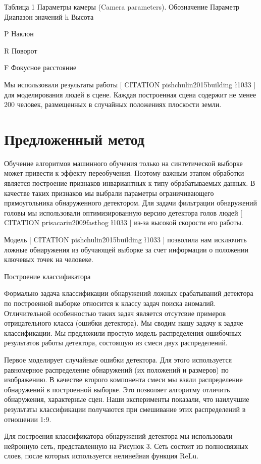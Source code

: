Таблица 1 Параметры камеры (Camera parameters).
Обозначение
Параметр
Диапазон значений
h
Высота

P
Наклон

R
Поворот

F
Фокусное расстояние

Мы использовали результаты работы [ CITATION pishchulin2015building \l 1033 ] для моделирования людей в сцене. Каждая построенная сцена содержит не менее 200 человек, размещенных в случайных положениях плоскости земли.

\section{Предложенный метод}

Обучение алгоритмов машинного обучения только на синтетической выборке может привести к эффекту переобучения. Поэтому важным этапом обработки является построение признаков инвариантных к типу обрабатываемых данных. В качестве таких признаков мы выбрали параметры ограничивающего прямоугольника обнаруженного детектором. Для задачи фильтрации обнаружений головы мы использовали оптимизированную версию детектора голов людей [ CITATION prisacariu2009fasthog \l 1033 ] из-за высокой скорости его работы.

Модель [ CITATION pishchulin2015building \l 1033 ] позволила нам исключить ложные обнаружения из обучающей выборке за счет информации о положении ключевых точек на человеке.

Построение классификатора

Формально задача классификации обнаружений ложных срабатываний детектора по построенной выборке относится к классу задач поиска аномалий. Отличительной особенностью таких задач является отсутсвие примеров отрицательного класса (ошибки детектора). Мы сводим нашу задачу к задаче классификации. Мы предложили простую модель распределения ошибочных результатов работы детектора, состоящую из смеси двух распределений.

Первое моделирует случайные ошибки детектора. Для этого используется равномерное распределение обнаружений (их положений и размеров) по изображению. В качестве второго компонента смеси мы взяли распределение обнаружений в построенной выборке. Это позволяет алгоритму отличить обнаружения, характерные сцен. Наши эксперименты показали, что наилучшие результаты классификации получаются при смешивание этих распределений в отношении 1:9.

Для построения классификатора обнаружений детектора мы использовали нейронную сеть, представленную на Рисунок 3. Сеть состоит из полносвязных слоев, после которых используется нелинейная функция ReLu.

